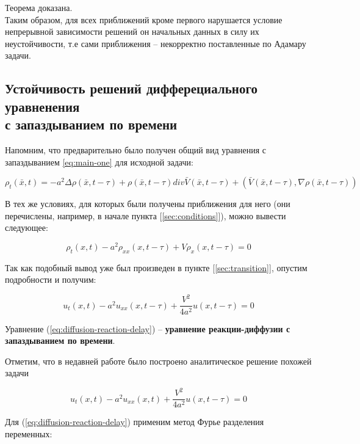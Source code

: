Теорема доказана.\\

Таким образом, для всех приближений кроме первого нарушается условие непрерывной зависимости решений он начальных данных в силу их неустойчивости, т.е сами приближения \--- некорректно поставленные по Адамару задачи.

\subsection{Устойчивость решений дифферециального уравненения\\с запаздыванием по времени}

Напомним, что предварительно было получен общий вид уравнения с запаздыванием \ref{eq:main-one} для исходной задачи:

\begin{equation*}
\rho_t(\bar{x},t) = -a^2 \Delta \rho(\bar{x},t-\tau) + \rho(\bar{x},t-\tau) div \bar{V}(\bar{x},t-\tau) + (\bar{V}(\bar{x},t-\tau),\nabla \rho(\bar{x},t-\tau))
\end{equation*}

В тех же условиях, для которых были получены приближения для него (они перечислены, например, в начале пункта [\ref{sec:conditions}]), можно вывести следующее:

\begin{equation}
\rho_t (x,t) - a^2 \rho_{xx} (x,t-\tau) + V \rho_x (x,t-\tau) = 0
\end{equation}

Так как подобный вывод уже был произведен в пункте [\ref{sec:transition}], опустим подробности и получим:

\begin{equation}\label{eq:diffusion-reaction-delay}
u_t (x,t) - a^2 u_{xx} (x,t-\tau) + \dfrac{V^2}{4a^2} u (x,t-\tau) = 0
\end{equation}

Уравнение (\ref{eq:diffusion-reaction-delay}) \--- \textbf{уравнение реакции-диффузии с запаздыванием по времени}.

Отметим, что в недавней работе \cite{bib:Polyanin-Zhurov} было построено аналитическое решение похожей задачи

\begin{equation}
u_t (x,t) - a^2 u_{xx} (x,t) + \dfrac{V^2}{4a^2} u (x,t-\tau) = 0
\end{equation}

Для (\ref{eq:diffusion-reaction-delay}) применим метод Фурье разделения переменных:


